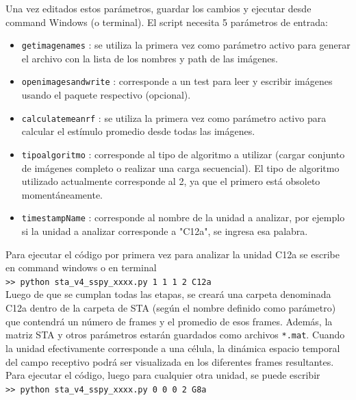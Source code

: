 \documentclass[10pt]{article}
\begin{document}
Una vez editados estos parámetros, guardar los cambios y ejecutar desde command Windows (o terminal). El script necesita 5 parámetros de entrada: \\
\begin{itemize}
\item \verb+getimagenames+ : se utiliza la primera vez como parámetro activo para generar el archivo con la lista de los nombres y path de las imágenes. \\
\item \verb+openimagesandwrite+ : corresponde a un test para leer y escribir imágenes usando el paquete respectivo (opcional). \\
\item \verb+calculatemeanrf+ : se utiliza la primera vez como parámetro activo para calcular el estímulo promedio desde todas las imágenes.\\
\item \verb+tipoalgoritmo+ : corresponde al tipo de algoritmo a utilizar (cargar conjunto de imágenes completo o realizar una carga secuencial). El tipo de algoritmo utilizado actualmente corresponde al 2, ya que el primero está obsoleto momentáneamente.\\
\item \verb+timestampName+ : corresponde al nombre de la unidad a analizar, por ejemplo si la unidad a analizar corresponde a "C12a", se ingresa esa palabra. \\
\end{itemize}

Para ejecutar el código por primera vez para analizar la unidad C12a se escribe en command windows o en terminal \\
\verb+>> python sta_v4_sspy_xxxx.py 1 1 1 2 C12a+ \\
Luego de que se cumplan todas las etapas, se creará una carpeta denominada C12a dentro de la carpeta de STA (según el nombre definido como parámetro) que contendrá un número de frames y el promedio de esos frames. Además, la matriz STA y otros parámetros estarán guardados como archivos \verb+*.mat+. Cuando la unidad efectivamente corresponde a una célula, la dinámica espacio temporal del campo receptivo podrá ser visualizada en los diferentes frames resultantes.\\

Para ejecutar el código, luego para cualquier otra unidad, se puede escribir \\
\verb+>> python sta_v4_sspy_xxxx.py 0 0 0 2 G8a+ \\
\end{document}
